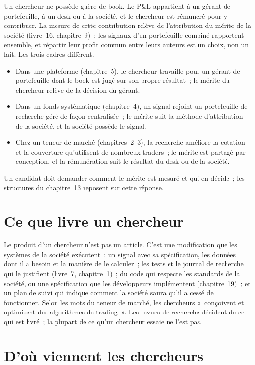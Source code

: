 Un chercheur ne possède guère de book. Le P\&L appartient à un gérant de portefeuille, à un desk ou à la société, et le
chercheur est rémunéré pour y contribuer. La mesure de cette contribution relève de l'attribution du mérite de la société (livre~16,
chapitre~9)~: les signaux d'un portefeuille combiné rapportent ensemble, et répartir leur profit commun entre leurs auteurs est un
choix, non un fait. Les trois cadres diffèrent.
\begin{itemize}
\item Dans une plateforme (chapitre~5), le chercheur travaille pour un gérant de portefeuille dont le book est jugé sur son propre résultat~; le
mérite du chercheur relève de la décision du gérant.
\item Dans un fonds systématique (chapitre~4), un signal rejoint un portefeuille de recherche géré de façon centralisée~; le mérite suit la
méthode d'attribution de la société, et la société possède le signal.
\item Chez un teneur de marché (chapitres~2--3), la recherche améliore la cotation et la couverture qu'utilisent de nombreux traders~; le mérite est partagé par
conception, et la rémunération suit le résultat du desk ou de la société.
\end{itemize}
Un candidat doit demander comment le mérite est mesuré et qui en décide~; les structures du chapitre~13 reposent sur cette réponse.

\section{Ce que livre un chercheur}

Le produit d'un chercheur n'est pas un article. C'est une modification que les systèmes de la société exécutent~: un signal avec sa spécification, les
données dont il a besoin et la manière de le calculer~; les tests et le journal de recherche qui le justifient (livre~7, chapitre~1)~; du code qui
respecte les standards de la société, ou une spécification que les développeurs implémentent (chapitre~19)~; et un plan de suivi qui indique comment
la société saura qu'il a cessé de fonctionner. Selon les mots du teneur de marché, les chercheurs «~conçoivent et optimisent des algorithmes de trading~».
Les revues de recherche décident de ce qui est livré~; la plupart de ce qu'un chercheur essaie ne l'est pas.

\section{D'où viennent les chercheurs}

